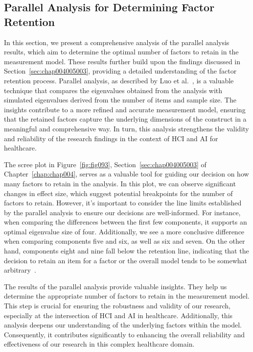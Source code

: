 \subsection{Parallel Analysis for Determining Factor Retention}
\label{chap:app002004003}

In this section, we present a comprehensive analysis of the parallel analysis results, which aim to determine the optimal number of factors to retain in the measurement model.
These results further build upon the findings discussed in Section~\ref{sec:chap004005003}, providing a detailed understanding of the factor retention process.
Parallel analysis, as described by Luo et al.~\cite{doi:10.1080/10705511.2019.1615835}, is a valuable technique that compares the eigenvalues obtained from the analysis with simulated eigenvalues derived from the number of items and sample size.
The insights contribute to a more refined and accurate measurement model, ensuring that the retained factors capture the underlying dimensions of the construct in a meaningful and comprehensive way.
In turn, this analysis strengthens the validity and reliability of the research findings in the context of \ac{HCI} and \ac{AI} for healthcare.

\textcolor{revised}{The scree plot in \textcolor{revised}{Figure~\ref{fig:fig093}, Section~\ref{sec:chap004005003} of Chapter~\ref{chap:chap004}}, serves as a valuable tool for guiding our decision on how many factors to retain in the analysis.
In this plot, we can observe significant changes in effect size, which suggest potential breakpoints for the number of factors to retain.
However, it's important to consider the line limits established by the parallel analysis to ensure our decisions are well-informed.
For instance, when comparing the differences between the first few components, it supports an optimal eigenvalue size of four.
Additionally, we see a more conclusive difference when comparing components five and six, as well as six and seven.
On the other hand, components eight and nine fall below the retention line, indicating that the decision to retain an item for a factor or the overall model tends to be somewhat arbitrary~\cite{CALISTO2022102922}.}

\textcolor{revised}{The results of the parallel analysis provide valuable insights.
They help us determine the appropriate number of factors to retain in the measurement model.
This step is crucial for ensuring the robustness and validity of our research, especially at the intersection of \ac{HCI} and \ac{AI} in healthcare.
Additionally, this analysis deepens our understanding of the underlying factors within the model.
Consequently, it contributes significantly to enhancing the overall reliability and effectiveness of our research in this complex healthcare domain.}

